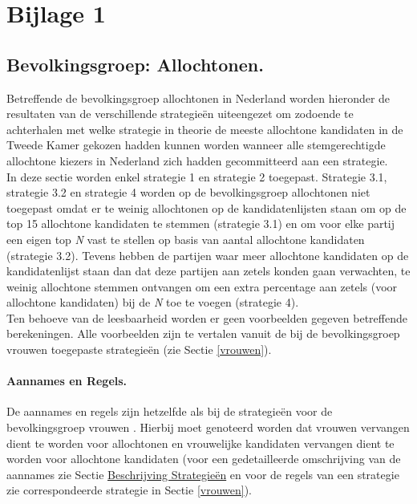 \newpage
\section{Bijlage 1}
\label{b1}


\subsection{Bevolkingsgroep: Allochtonen.}
\label{allochtonen}

Betreffende de bevolkingsgroep allochtonen in Nederland worden hieronder de resultaten van de verschillende strategie\"{e}n uiteengezet om zodoende te achterhalen met welke strategie in theorie de meeste allochtone kandidaten in de Tweede Kamer gekozen hadden kunnen worden wanneer alle stemgerechtigde allochtone kiezers in Nederland zich hadden gecommitteerd aan een strategie.\\
\indent In deze sectie worden enkel strategie 1 en strategie 2 toegepast. Strategie 3.1, strategie 3.2 en strategie 4 worden op de bevolkingsgroep allochtonen niet toegepast omdat er te weinig allochtonen op de kandidatenlijsten staan om op de top 15 allochtone kandidaten te stemmen (strategie 3.1) en om voor elke partij een eigen top \textit{N} vast te stellen op basis van aantal allochtone kandidaten (strategie 3.2). Tevens hebben de partijen waar meer allochtone kandidaten op de kandidatenlijst staan dan dat deze partijen aan zetels konden gaan verwachten, te weinig allochtone stemmen ontvangen om een extra percentage aan zetels (voor allochtone kandidaten) bij de \textit{N} toe te voegen (strategie 4).\\
\indent Ten behoeve van de leesbaarheid worden er geen voorbeelden gegeven betreffende berekeningen. Alle voorbeelden zijn te vertalen vanuit de bij de bevolkingsgroep vrouwen toegepaste strategie\"{e}n (zie Sectie \ref{vrouwen}). 

\paragraph{Aannames en Regels.}
De aannames en regels zijn hetzelfde als bij de strategie\"{e}n voor de bevolkingsgroep vrouwen . Hierbij moet genoteerd worden dat vrouwen vervangen dient te worden voor allochtonen en vrouwelijke kandidaten vervangen dient te worden voor allochtone kandidaten (voor een gedetailleerde omschrijving van de aannames zie Sectie \hyperref[besS]{Beschrijving Strategie\"{e}n} en voor de regels van een strategie zie correspondeerde strategie in Sectie \ref{vrouwen}).


